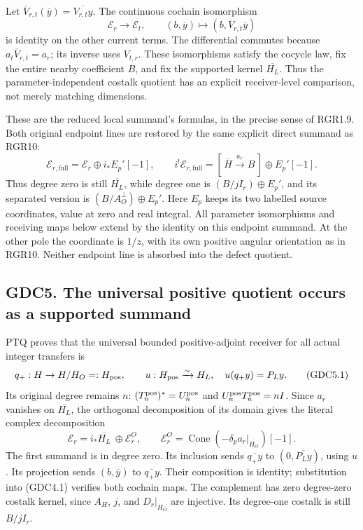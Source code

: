 Let \(\overline V_{r,t}(\overline y)=\overline{V_{r,t}y}\). The
continuous cochain isomorphism \[
\mathscr E_r\longrightarrow\mathscr E_t,
\qquad (b,\overline y)\longmapsto(b,\overline V_{r,t}\overline y)
\tag{GDC4.6}
\] is identity on the other current terms. The differential commutes
because \(a_t\overline V_{r,t}=a_r\); its inverse uses \(V_{t,r}\).
These isomorphisms satisfy the cocycle law, fix the entire nearby
coefficient \(B\), and fix the supported kernel \(\overline{H_L}\). Thus
the parameter-independent costalk quotient has an explicit
receiver-level comparison, not merely matching dimensions.

These are the reduced local summand's formulas, in the precise sense of
RGR1.9. Both original endpoint lines are restored by the same explicit
direct summand as RGR10: \[
\mathscr E_{r,\mathrm{full}}=\mathscr E_r\oplus i_*E_p'[-1],
\qquad
i^!\mathscr E_{r,\mathrm{full}}
=[\,\overline H\xrightarrow{a_r}B\,]\oplus E_p'[-1].
\tag{GDC4.7}
\] Thus degree zero is still \(\overline{H_L}\), while degree one is
\((B/jI_r)\oplus E_p'\), and its separated version is
\((B/A_O^\perp)\oplus E_p'\). Here \(E_p\) keeps its two labelled source
coordinates, value at zero and real integral. All parameter isomorphisms
and receiving maps below extend by the identity on this endpoint
summand. At the other pole the coordinate is \(1/z\), with its own
positive angular orientation as in RGR10. Neither endpoint line is
absorbed into the defect quotient.

\subsection{GDC5. The universal positive quotient occurs as a supported
summand}\label{gdc5.-the-universal-positive-quotient-occurs-as-a-supported-summand}

PTQ proves that the universal bounded positive-adjoint receiver for all
actual integer transfers is \[
q_+:H\to H/H_O=:H_{\rm pos},\qquad
u:H_{\rm pos}\xrightarrow{\sim}H_L,\quad u(q_+y)=P_Ly.
\tag{GDC5.1}
\] Its original degree remains \(n\):
\((T_n^{\rm pos})^*=U_n^{\rm pos}\) and
\(U_n^{\rm pos}T_n^{\rm pos}=nI\). Since \(a_r\) vanishes on
\(\overline{H_L}\), the orthogonal decomposition of its domain gives the
literal complex decomposition \[
\boxed{\mathscr E_r=i_*\overline{H_L}\ \oplus
\mathscr E_r^O,\qquad
\mathscr E_r^O=\operatorname{Cone}(-\delta_pa_r|_{\overline{H_O}})[-1].}
\tag{GDC5.2}
\] The first summand is in degree zero. Its inclusion sends
\(\overline{q_+y}\) to \((0,\overline{P_Ly})\), using \(u\). Its
projection sends \((b,\overline y)\) to \(\overline{q_+y}\). Their
composition is identity; substitution into (GDC4.1) verifies both
cochain maps. The complement has zero degree-zero costalk kernel, since
\(A_H\), \(j\), and \(D_r|_{H_O}\) are injective. Its degree-one costalk
is still \(B/jI_r\).

